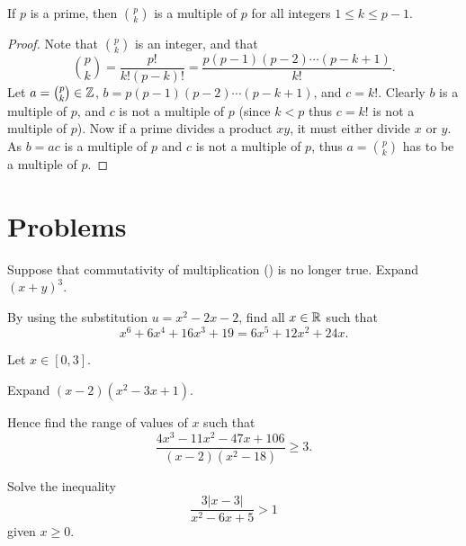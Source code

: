 \begin{proposition}\label{prop-binomial-coefficient-multiple-of-p}
    If $p$ is a prime, then $p\choose k$ is a multiple of $p$ for all integers $1 \leq k \leq p - 1$.
\end{proposition}
\begin{proof}
    Note that $p \choose k$ is an integer, and that
    \[
        {p \choose k} = \frac{p!}{k!(p-k)!} = \frac{p(p-1)(p-2)\cdots(p-k+1)}{k!}.
    \]
    Let $a = {p \choose k} \in \mathbb{Z}$, $b = p(p-1)(p-2)\cdots(p-k+1)$, and $c = k!$. Clearly $b$ is a multiple of $p$, and $c$ is not a multiple of $p$ (since $k < p$ thus $c = k!$ is not a multiple of $p$). Now if a prime divides a product $xy$, it must either divide $x$ or $y$. As $b = ac$ is a multiple of $p$ and $c$ is not a multiple of $p$, thus $a = {p \choose k}$ has to be a multiple of $p$.
\end{proof}

\newpage

\section{Problems}
\begin{problem}
    Suppose that commutativity of multiplication () is no longer true. Expand $(x+y)^3$.
\end{problem}

\begin{problem}
    By using the substitution $u = x^2 - 2x - 2$, find all $x \in \mathbb{R}$ such that
    \[
        x^6 + 6x^4 + 16x^3 + 19 = 6x^5 + 12x^2 + 24x.
    \]
\end{problem}

\begin{problem}
    Let $x \in [0,3]$.
    \begin{partquestions}{\roman*}
        \item Expand $(x-2)(x^2-3x+1)$.
        \item Hence find the range of values of $x$ such that
        \[
            \frac{4x^3 - 11x^2 - 47x + 106}{(x-2)(x^2-18)} \geq 3.
        \]
    \end{partquestions}
\end{problem}

\begin{problem}
    Solve the inequality
    \[
        \frac{3|x-3|}{x^2-6x+5} > 1
    \]
    given $x \geq 0$.
\end{problem}

